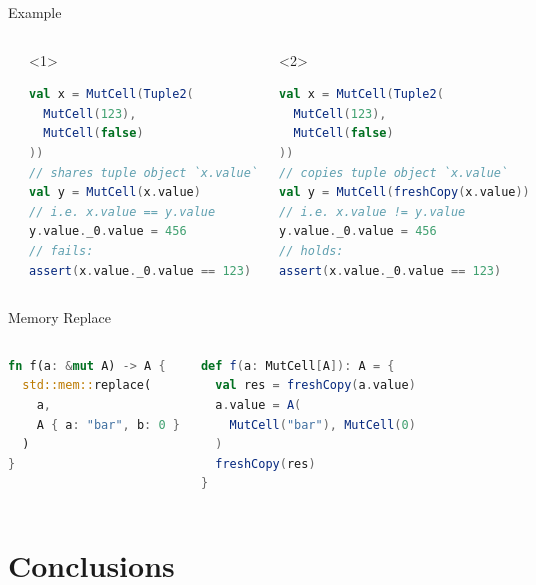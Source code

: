 \begin{frame}[fragile]{Example}
\begin{columns}[T]
\begin{lstlisting}[language=Rust]
let x = (
  123,
  false
);
// copies `x`
let mut y = x;

y.0 = 456;
// holds:
assert!(x.0 == 123)
\end{lstlisting}
\begin{onlyenv}<1>
\begin{lstlisting}[language=Scala]
val x = MutCell(Tuple2(
  MutCell(123),
  MutCell(false)
))
// shares tuple object `x.value`
val y = MutCell(x.value)
// i.e. x.value == y.value
y.value._0.value = 456
// fails:
assert(x.value._0.value == 123)
\end{lstlisting}
\end{onlyenv}
\begin{onlyenv}<2>
\begin{lstlisting}[language=Scala]
val x = MutCell(Tuple2(
  MutCell(123),
  MutCell(false)
))
// copies tuple object `x.value`
val y = MutCell(freshCopy(x.value))
// i.e. x.value != y.value
y.value._0.value = 456
// holds:
assert(x.value._0.value == 123)
\end{lstlisting}
\end{onlyenv}
\end{columns}
\end{frame}

\begin{frame}[fragile]{Memory Replace}
\begin{columns}[T]
\begin{lstlisting}[language=Rust]
fn f(a: &mut A) -> A {
  std::mem::replace(
    a,
    A { a: "bar", b: 0 }
  )
}
\end{lstlisting}
\begin{lstlisting}[language=Scala]
def f(a: MutCell[A]): A = {
  val res = freshCopy(a.value)
  a.value = A(
    MutCell("bar"), MutCell(0)
  )
  freshCopy(res)
}
\end{lstlisting}
\end{columns}
\end{frame}


\section{Conclusions}

